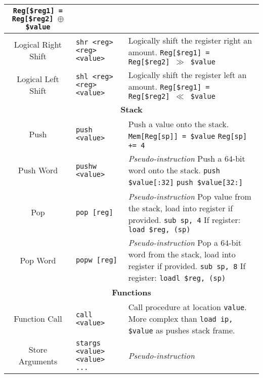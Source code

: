 \documentclass{article}
\begin{document}
\begin{longtable}{|c|l|l|}
{    \texttt{Reg[\$reg1] = Reg[\$reg2] \(\oplus\) \$value}} \\
    \hline
    Logical Right Shift & \texttt{shr <reg> <reg> <value>} & \makecell[l]{Logically shift the register right an amount.\\%
    \texttt{Reg[\$reg1] = Reg[\$reg2] \(\gg\) \$value}} \\
    \hline
    Logical Left Shift & \texttt{shl <reg> <reg> <value>} & \makecell[l]{Logically shift the register left an amount.\\%
    \texttt{Reg[\$reg1] = Reg[\$reg2] \(\ll\) \$value}} \\
    \hline \hline
    \multicolumn{3}{|c|}{\textbf{Stack}} \\
    \hline
    Push & \texttt{push <value>} & \makecell[l]{Push a value onto the stack.\\%
    \texttt{Mem[Reg[sp]] = \$value}\\%
    \texttt{Reg[sp] += 4}} \\
    \hline
    Push Word & \texttt{pushw <value>} & \makecell[l]{\textit{Pseudo-instruction}\\%
    Push a 64-bit word onto the stack.\\%
    \texttt{push \$value[:32]}\\%
    \texttt{push \$value[32:]}} \\
    \hline
    Pop & \texttt{pop [reg]} & \makecell[l]{\textit{Pseudo-instruction}\\%
    Pop value from the stack, load into register if provided.\\%
    \texttt{sub sp, 4}\\%
    If register: \texttt{load \$reg, (sp)}} \\
    \hline
    Pop Word & \texttt{popw [reg]} & \makecell[l]{\textit{Pseudo-instruction}\\%
    Pop a 64-bit word from the stack, load into register if provided.\\%
    \texttt{sub sp, 8}\\%
    If register: \texttt{loadl \$reg, (sp)}} \\
    \hline \hline
    \multicolumn{3}{|c|}{\textbf{Functions}} \\
    \hline
    Function Call & \texttt{call <value>} & \makecell[l]{Call procedure at location \texttt{value}.\\%
    More complex than \texttt{load ip, \$value} as pushes stack frame.} \\
    \hline
    Store Arguments & \texttt{stargs <value> <value> ...} & \makecell[l]{\textit{Pseudo-instruction}\\%
}
\end{longtable}
\end{document}
